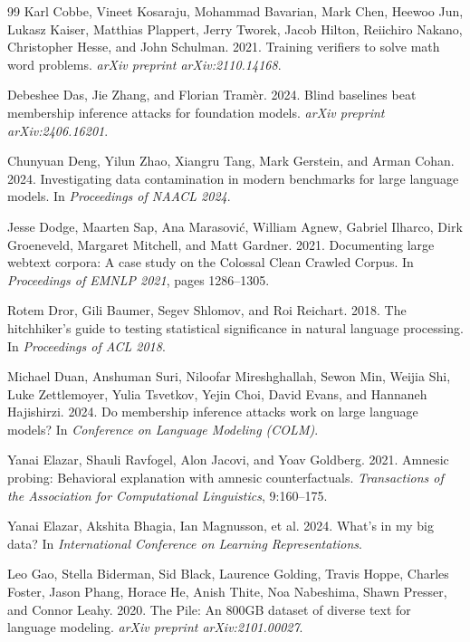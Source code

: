 \documentclass[10pt,twocolumn,letterpaper]{article}
\begin{document}
\begin{thebibliography}{99}
Karl Cobbe, Vineet Kosaraju, Mohammad Bavarian, Mark Chen, Heewoo Jun, Lukasz Kaiser, Matthias Plappert, Jerry Tworek, Jacob Hilton, Reiichiro Nakano, Christopher Hesse, and John Schulman. 2021.
Training verifiers to solve math word problems.
\emph{arXiv preprint arXiv:2110.14168}.

Debeshee Das, Jie Zhang, and Florian Tram\`er. 2024.
Blind baselines beat membership inference attacks for foundation models.
\emph{arXiv preprint arXiv:2406.16201}.

Chunyuan Deng, Yilun Zhao, Xiangru Tang, Mark Gerstein, and Arman Cohan. 2024.
Investigating data contamination in modern benchmarks for large language models.
In \emph{Proceedings of NAACL 2024}.

Jesse Dodge, Maarten Sap, Ana Marasovi\'c, William Agnew, Gabriel Ilharco, Dirk Groeneveld, Margaret Mitchell, and Matt Gardner. 2021.
Documenting large webtext corpora: A case study on the Colossal Clean Crawled Corpus.
In \emph{Proceedings of EMNLP 2021}, pages 1286--1305.

Rotem Dror, Gili Baumer, Segev Shlomov, and Roi Reichart. 2018.
The hitchhiker's guide to testing statistical significance in natural language processing.
In \emph{Proceedings of ACL 2018}.

Michael Duan, Anshuman Suri, Niloofar Mireshghallah, Sewon Min, Weijia Shi, Luke Zettlemoyer, Yulia Tsvetkov, Yejin Choi, David Evans, and Hannaneh Hajishirzi. 2024.
Do membership inference attacks work on large language models?
In \emph{Conference on Language Modeling (COLM)}.

Yanai Elazar, Shauli Ravfogel, Alon Jacovi, and Yoav Goldberg. 2021.
Amnesic probing: Behavioral explanation with amnesic counterfactuals.
\emph{Transactions of the Association for Computational Linguistics}, 9:160--175.

Yanai Elazar, Akshita Bhagia, Ian Magnusson, et al. 2024.
What's in my big data?
In \emph{International Conference on Learning Representations}.

Leo Gao, Stella Biderman, Sid Black, Laurence Golding, Travis Hoppe, Charles Foster, Jason Phang, Horace He, Anish Thite, Noa Nabeshima, Shawn Presser, and Connor Leahy. 2020.
The Pile: An 800GB dataset of diverse text for language modeling.
\emph{arXiv preprint arXiv:2101.00027}.


\end{thebibliography}
\end{document}
